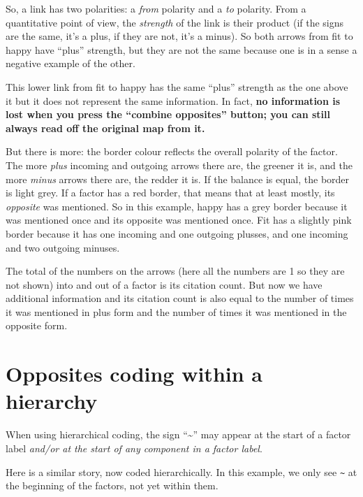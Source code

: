 \documentclass[
]{book}
\begin{document}
So, a link has two polarities: a \emph{from} polarity and a \emph{to} polarity. From a quantitative point of view, the \emph{strength} of the link is their product (if the signs are the same, it's a plus, if they are not, it's a minus). So both arrows from fit to happy have ``plus'' strength, but they are not the same because one is in a sense a negative example of the other.

This lower link from fit to happy has the same ``plus'' strength as the one above it but it does not represent the same information. In fact, \textbf{no information is lost when you press the ``combine opposites'' button; you can still always read off the original map from it.}

But there is more: the border colour reflects the overall polarity of the factor. The more \emph{plus} incoming and outgoing arrows there are, the greener it is, and the more \emph{minus} arrows there are, the redder it is. If the balance is equal, the border is light grey. If a factor has a red border, that means that at least mostly, its \emph{opposite} was mentioned. So in this example, happy has a grey border because it was mentioned once and its opposite was mentioned once. Fit has a slightly pink border because it has one incoming and one outgoing plusses, and one incoming and two outgoing minuses.

The total of the numbers on the arrows (here all the numbers are 1 so they are not shown) into and out of a factor is its citation count. But now we have additional information and its citation count is also equal to the number of times it was mentioned in plus form and the number of times it was mentioned in the opposite form.

\hypertarget{opposites-coding-within-a-hierarchy}{%
\section{Opposites coding within a hierarchy}\label{opposites-coding-within-a-hierarchy}}

When using hierarchical coding, the sign ``\textasciitilde{}'' may appear at the start of a factor label \emph{and/or at the start of any component in a factor label}.

Here is a similar story, now coded hierarchically. In this example, we only see \texttt{\textasciitilde{}} at the beginning of the factors, not yet within them.
\end{document}
